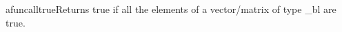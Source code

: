 afunc{alltrue}{Returns true if all the elements of a vector/matrix of type \_bl are true.}
\\\cvsiplh
\\\pyjvsiph

